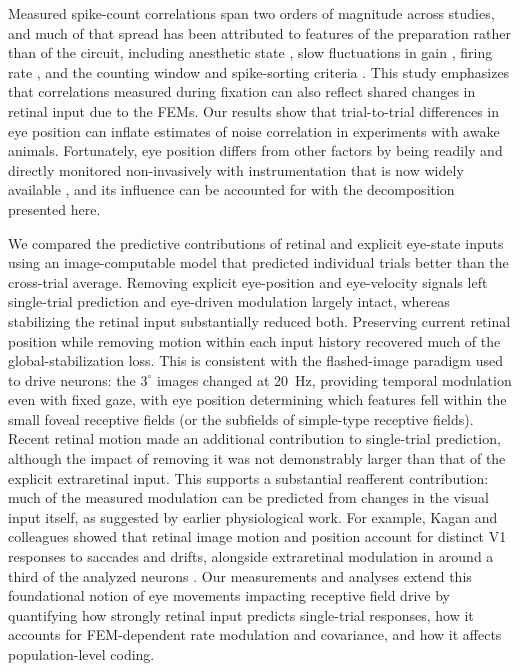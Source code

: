 \documentclass{lite}
\begin{document}
Measured spike-count correlations span two orders of magnitude across studies, and much of that spread has been attributed to features of the preparation rather than of the circuit, including anesthetic state \cite{ecker2014state}, slow fluctuations in gain \cite{goris2014partitioning}, firing rate \cite{delarocha2007correlation}, and the counting window and spike-sorting criteria \cite{cohen2011measuring}. This study emphasizes that correlations measured during fixation can also reflect shared changes in retinal input due to the FEMs. Our results show that trial-to-trial differences in eye position can inflate estimates of noise correlation in experiments with awake animals. Fortunately, eye position differs from other factors by being readily and directly monitored non-invasively with instrumentation that is now widely available \cite{wu2023high, ressmeyer2025openirisdpi, yates2023detailed}, and its influence can be accounted for with the decomposition presented here.

We compared the predictive contributions of retinal and explicit eye-state inputs using an image-computable model that predicted individual trials better than the cross-trial average. Removing explicit eye-position and eye-velocity signals left single-trial prediction and eye-driven modulation largely intact, whereas stabilizing the retinal input substantially reduced both. Preserving current retinal position while removing motion within each input history recovered much of the global-stabilization loss. This  is consistent with the flashed-image paradigm used to drive neurons: the $3^\circ$ images changed at 20~Hz, providing temporal modulation even with fixed gaze, with eye position determining which features fell within the small foveal receptive fields (or the subfields of simple-type receptive fields). Recent retinal motion made an additional contribution to single-trial prediction, although the impact of removing it was not demonstrably larger than that of the explicit extraretinal input. This supports a substantial reafferent contribution: much of the measured modulation can be predicted from changes in the visual input itself, as suggested by earlier physiological work. For example, Kagan and colleagues showed that retinal image motion and position account for distinct V1 responses to saccades and drifts, alongside extraretinal modulation in around a third of the analyzed neurons \cite{snodderly2001selective,kagan2008saccades}. Our measurements and analyses extend this foundational notion of eye movements impacting receptive field drive by quantifying how strongly retinal input predicts single-trial responses, how it accounts for FEM-dependent rate modulation and covariance, and how it affects population-level coding.
\end{document}

